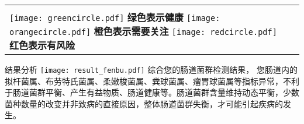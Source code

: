 \begin{longtable}{m{4.8cm}m{5.2cm}<{\centering}m{0cm}@{}m{4.61cm}<{\centering}}
\hline
\multicolumn{3}{l}{}\\
\multicolumn{3}{l}{\texttt{[image: greencircle.pdf]} {\fontsize{9.3pt}{11pt}\selectfont\bf 绿色表示健康}   \texttt{[image: orangecircle.pdf]}  {\fontsize{9.3pt}{11pt}\selectfont\bf 橙色表示需要关注}  \texttt{[image: redcircle.pdf]} {\fontsize{9.3pt}{11pt}\selectfont\bf 红色表示有风险}}
\end{longtable}

\vspace*{6mm}
\begin{LRaside}[.8]{结果分析}
\noindent
\texttt{[image: result\_fenbu.pdf]}
\asidebreak %
综合您的肠道菌群检测结果，
您肠道内的拟杆菌属、布劳特氏菌属、柔嫩梭菌属、粪球菌属、瘤胃球菌属等指标异常，不利于肠道菌群平衡、产生有益物质、肠道健康等。肠道菌群含量维持动态平衡，少数菌种数量的改变并非致病的直接原因，整体肠道菌群失衡，才可能引起疾病的发生。
\end{LRaside}



